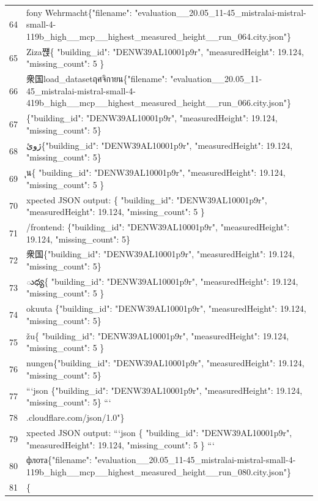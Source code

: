 \documentclass[a4paper,11pt]{article}
\begin{document}
\begin{table}[ht]
\begin{tabular}{r p{12cm}}
64 & fony Wehrmacht\{"filename": "evaluation\_\_20.05\_11-45\_mistralai-mistral-small-4-119b\_high\_\_mcp\_\_highest\_measured\_height\_\_run\_064.city.json"\} \\
65 &  Ziza쨵\{
  "building\_id": "DENW39AL10001p9r",
  "measuredHeight": 19.124,
  "missing\_count": 5
\} \\
66 & 衆国load\_datasetฤศจิกายน\{"filename": "evaluation\_\_20.05\_11-45\_mistralai-mistral-small-4-419b\_high\_\_mcp\_\_highest\_measured\_height\_\_run\_066.city.json"\} \\
67 & \{"building\_id": "DENW39AL10001p9r", "measuredHeight": 19.124, "missing\_count": 5\} \\
68 &  ژوئ\{"building\_id": "DENW39AL10001p9r", "measuredHeight": 19.124, "missing\_count": 5\} \\
69 & ุน\{
  "building\_id": "DENW39AL10001p9r",
  "measuredHeight": 19.124,
  "missing\_count": 5
\} \\
70 & xpected JSON output:
\{
  "building\_id": "DENW39AL10001p9r",
  "measuredHeight": 19.124,
  "missing\_count": 5
\} \\
71 & /frontend: \{"building\_id": "DENW39AL10001p9r", "measuredHeight": 19.124, "missing\_count": 5\} \\
72 & 衆国\{"building\_id": "DENW39AL10001p9r", "measuredHeight": 19.124, "missing\_count": 5\} \\
73 & ుధ్య\{
  "building\_id": "DENW39AL10001p9r",
  "measuredHeight": 19.124,
  "missing\_count": 5
\} \\
74 & okuuta
\{"building\_id": "DENW39AL10001p9r", "measuredHeight": 19.124, "missing\_count": 5\} \\
75 & žu\{
  "building\_id": "DENW39AL10001p9r",
  "measuredHeight": 19.124,
  "missing\_count": 5
\} \\
76 & ­nungen\{"building\_id": "DENW39AL10001p9r", "measuredHeight": 19.124, "missing\_count": 5\} \\
77 & ```json
\{"building\_id": "DENW39AL10001p9r", "measuredHeight": 19.124, "missing\_count": 5\}
``` \\
78 & .cloudflare.com/json/1.0"\} \\
79 & xpected JSON output:
```json
\{
  "building\_id": "DENW39AL10001p9r",
  "measuredHeight": 19.124,
  "missing\_count": 5
\}
``` \\
80 &  флота\{"filename": "evaluation\_\_20.05\_11-45\_mistralai-mistral-small-4-119b\_high\_\_mcp\_\_highest\_measured\_height\_\_run\_080.city.json"\} \\
81 & \{

\end{tabular}
\end{table}
\end{document}
